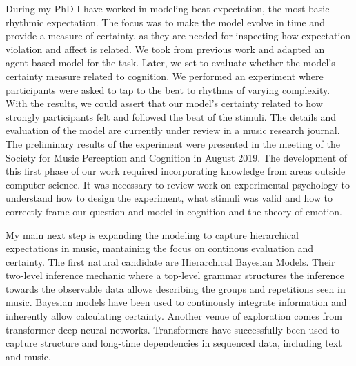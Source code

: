 During my PhD I have worked in modeling beat expectation, the most basic
rhythmic expectation. The focus was to make the model evolve in time and
provide a measure of certainty, as they are needed for inspecting how
expectation violation and affect is related. We took from previous work and
adapted an agent-based model for the task. Later, we set to evaluate whether
the model's certainty measure related to cognition. We performed an experiment
where participants were asked to tap to the beat to rhythms of varying
complexity. With the results, we could assert that our model's certainty
related to how strongly participants felt and followed the beat of the stimuli.
The details and evaluation of the model are currently under review in a music
research journal. The preliminary results of the experiment were presented in
the meeting of the Society for Music Perception and Cognition in August 2019.
The development of this first phase of our work required incorporating
knowledge from areas outside computer science. It was necessary to review work
on experimental psychology to understand how to design the experiment, what
stimuli was valid and how to correctly frame our question and model in
cognition and the theory of emotion.

My main next step is expanding the modeling to capture hierarchical
expectations in music, mantaining the focus on continous evaluation and
certainty. The first natural candidate are Hierarchical Bayesian Models. Their 
two-level inference mechanic where a top-level grammar structures the inference
towards the observable data allows describing the groups and repetitions seen
in music. Bayesian models have been used to continously integrate information
and inherently allow calculating certainty. Another venue of exploration comes
from transformer deep neural networks. Transformers have successfully been used
to capture structure and long-time dependencies in sequenced data, including
text and music. 
